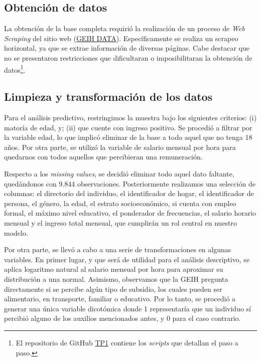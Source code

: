 \documentclass[11pt,oneside]{article}
\begin{document}
	\subsection{Obtención de datos}
	
	La obtención de la base completa requirió la realización de un proceso de \textit{Web Scraping} del sitio web (\href{https://ignaciomsarmiento.github.io/GEIH2018_sample/}{GEIH DATA}). Específicamente se realiza un scrapeo horizontal, ya que se extrae información de diversas páginas. Cabe destacar que no se presentaron restricciones que dificultaran o imposibilitaran la obtención de datos\footnote{El repositorio de GitHub \href{https://github.com/ebqz7/Machine_Learning_TP}{TP1} contiene los \textit{scripts} que detallan el paso a paso.}. 
	
	\subsection{Limpieza y transformación de los datos}
	
	Para el análisis predictivo, restringimos la muestra bajo los siguientes criterios: (i) matoría de edad, y; (ii) que cuente con ingreso positivo. Se procedió a filtrar por la variable edad, lo que implicó eliminar de la base a todo aquel que no tenga 18 años. Por otra parte, se utilizó la variable de salario mensual por hora para quedarnos con todos aquellos que percibieran una remuneración. 
	
	Respecto a los \textit{missing values}, se decidió eliminar todo aquel dato faltante, quedándonos con 9.844 observaciones. Posteriormente realizamos una selección de columnas: el directorio del individuo, el identificador de hogar, el identificador de persona, el género, la edad, el estrato socioeconómico, si cuenta con empleo formal, el máximo nivel educativo, el ponderador de frecuencias, el salario horario mensual y el ingreso total mensual, que cumplirán un rol central en nuestro modelo. 
	
	Por otra parte, se llevó a cabo a una serie de transformaciones en algunas variables. En primer lugar, y que será de utilidad para el análisis descriptivo, se aplica logaritmo natural al salario mensual por hora para aproximar su distribución a una normal. Asimismo, observamos que la GEIH pregunta directamente si se percibe algún tipo de subsidio, los cuales pueden ser alimentario, en transporte, familiar o educativo. Por lo tanto, se procedió a generar una única variable dicotómica donde 1 representaría que un individuo sí percibió alguno de los auxilios mencionados antes, y 0 para el caso contrario.
	
\end{document}
